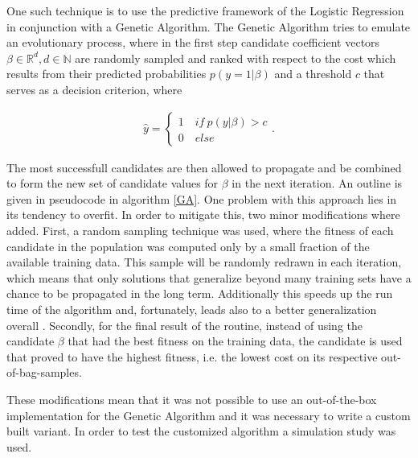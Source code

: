 One such technique is to use the predictive framework of the Logistic Regression in conjunction with a Genetic Algorithm. The Genetic Algorithm tries to emulate an evolutionary process, where in the first step candidate coefficient vectors $\beta \in \mathbb{R}^d, d \in \mathbb{N}$ are randomly sampled and ranked with respect to the cost which results from their predicted probabilities $p(y=1|\beta)$ and a threshold $c$ that serves as a decision criterion, where

\begin{align*}
\hat{y} = \begin{cases}
  1 \quad if\ p(y|\beta) > c\\
  0 \quad else
\end{cases}.
\end{align*}

The most successfull candidates are then allowed to propagate and be combined to form the new set of candidate values for $\beta$ in the next iteration. An outline is given in pseudocode in algorithm \ref{GA}. One problem with this approach lies in its tendency to overfit. In order to mitigate this, two minor modifications where added. First, a random sampling technique was used, where the fitness of each candidate in the population was computed only by a small fraction of the available training data. This sample will be randomly redrawn in each iteration, which means that only solutions that generalize beyond many training sets have a chance to be propagated in the long term. Additionally this speeds up the run time of the algorithm and, fortunately, leads also to a better generalization overall \cite{garst}. Secondly, for the final result of the routine, instead of using the candidate $\beta$ that had the best fitness on the training data, the candidate is used that proved to have the highest fitness, i.e. the lowest cost on its respective out-of-bag-samples.

These modifications mean that it was not possible to use an out-of-the-box implementation for the Genetic Algorithm and it was necessary to write a custom built variant. In order to test the customized algorithm a simulation study was used.